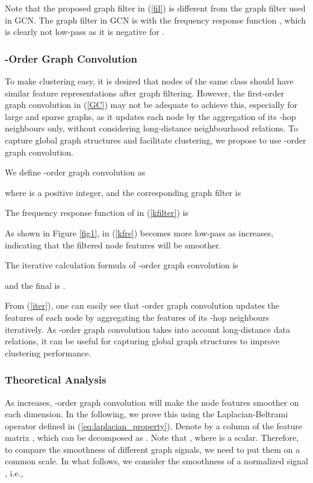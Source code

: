\documentclass{article}
\begin{document}
Note that the proposed graph filter in (\ref{fil}) is different from the graph filter used in GCN. The graph filter in GCN is  with the frequency response function  \cite{Qimai19}, which is clearly not low-pass as it is negative for  .

\subsubsection{-Order Graph Convolution}

To make clustering easy, it is desired that nodes of the same class should have similar feature representations after graph filtering. However, the first-order graph convolution in (\ref{GC}) may not be adequate to achieve this, especially for large and sparse graphs, as it updates each node  by the aggregation of its -hop neighbours only, without considering long-distance neighbourhood relations. To capture global graph structures and facilitate clustering, we propose to use -order graph convolution.



We define -order graph convolution as

where  is a positive integer, and the corresponding graph filter is

The frequency response function of  in (\ref{kfilter}) is

As shown in Figure \ref{fig1},  in (\ref{kfre}) becomes more low-pass as  increases, indicating that the filtered node features  will be smoother.

The iterative calculation formula of -order graph convolution is

and the final  is .

From (\ref{iter}), one can easily see that -order graph convolution updates the features of each node  by aggregating the features of its -hop neighbours iteratively. As -order graph convolution takes into account long-distance data relations, it can be useful for capturing global graph structures to improve clustering performance.

\subsubsection{Theoretical Analysis}
As  increases, -order graph convolution will make the node features smoother on each dimension. In the following, we prove this using the Laplacian-Beltrami operator  defined in (\ref{eq:laplacian_property}).
Denote by  a column of the feature matrix , which can be decomposed as . Note that , where  is a scalar. Therefore, to compare the smoothness of different graph signals, we need to put them on a common scale. In what follows, we consider the smoothness of a normalized signal , i.e.,
\end{document}
